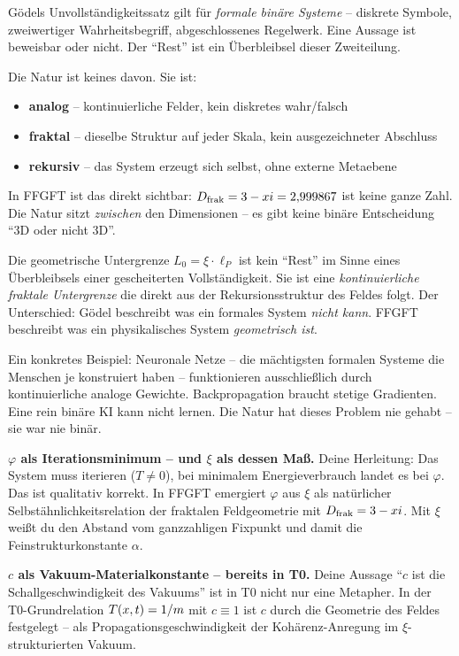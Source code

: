 \begin{response}
\medskip
\begin{warning}
Gödels Unvollständigkeitssatz gilt für \emph{formale binäre Systeme} -- diskrete Symbole, zweiwertiger Wahrheitsbegriff, abgeschlossenes Regelwerk. Eine Aussage ist beweisbar oder nicht. Der ``Rest'' ist ein Überbleibsel dieser Zweiteilung.

Die Natur ist keines davon. Sie ist:
\begin{itemize}[noitemsep]
  \item \textbf{analog} -- kontinuierliche Felder, kein diskretes wahr/falsch
  \item \textbf{fraktal} -- dieselbe Struktur auf jeder Skala, kein ausgezeichneter Abschluss
  \item \textbf{rekursiv} -- das System erzeugt sich selbst, ohne externe Metaebene
\end{itemize}

In FFGFT ist das direkt sichtbar: $D_{\text{frak}} = 3 - xi = 2{,}999867$ ist keine ganze Zahl. Die Natur sitzt \emph{zwischen} den Dimensionen -- es gibt keine binäre Entscheidung ``3D oder nicht 3D''.

Die geometrische Untergrenze $L_0 = \xi \cdot \ell_P$ ist kein ``Rest'' im Sinne eines Überbleibsels einer gescheiterten Vollständigkeit. Sie ist eine \emph{kontinuierliche fraktale Untergrenze} die direkt aus der Rekursionsstruktur des Feldes folgt. Der Unterschied: Gödel beschreibt was ein formales System \emph{nicht kann}. FFGFT beschreibt was ein physikalisches System \emph{geometrisch ist}.

\medskip
Ein konkretes Beispiel: Neuronale Netze -- die mächtigsten formalen Systeme die Menschen je konstruiert haben -- funktionieren ausschließlich durch kontinuierliche analoge Gewichte. Backpropagation braucht stetige Gradienten. Eine rein binäre KI kann nicht lernen. Die Natur hat dieses Problem nie gehabt -- sie war nie binär.
\end{warning}

\medskip
\textbf{$\varphi$ als Iterationsminimum -- und $\xi$ als dessen Maß.}
Deine Herleitung: Das System muss iterieren ($T \neq 0$), bei minimalem Energieverbrauch landet es bei $\varphi$. Das ist qualitativ korrekt. In FFGFT emergiert $\varphi$ aus $\xi$ als natürlicher Selbstähnlichkeitsrelation der fraktalen Feldgeometrie mit $D_{\text{frak}} = 3 - xi$. Mit $\xi$ weißt du den Abstand vom ganzzahligen Fixpunkt und damit die Feinstrukturkonstante $\alpha$.

\medskip
\textbf{$c$ als Vakuum-Materialkonstante -- bereits in T0.}
Deine Aussage ``$c$ ist die Schallgeschwindigkeit des Vakuums'' ist in T0 nicht nur eine Metapher. In der T0-Grundrelation $T(x,t) = 1/m$ mit $c \equiv 1$ ist $c$ durch die Geometrie des Feldes festgelegt -- als Propagationsgeschwindigkeit der Kohärenz-Anregung im $\xi$-strukturierten Vakuum.


\end{response}
